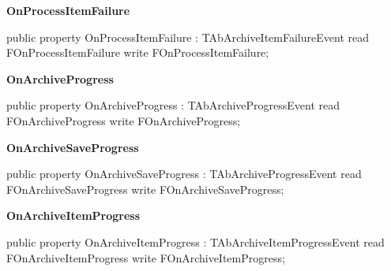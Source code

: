 \documentclass{report}
\newif\ifpdf
\begin{document}
\begin{list}{}
\begin{flushleft}
\ifpdf
\end{flushleft}
\fi


\par  \label{AbArcTyp.TAbArchive-OnProcessItemFailure}
\item[\textbf{OnProcessItemFailure}\hfill]
\ifpdf
\begin{flushleft}
\fi
\begin{ttfamily}
public property OnProcessItemFailure : TAbArchiveItemFailureEvent
      read FOnProcessItemFailure
      write FOnProcessItemFailure;\end{ttfamily}

\ifpdf
\end{flushleft}
\fi


\par  \label{AbArcTyp.TAbArchive-OnArchiveProgress}
\item[\textbf{OnArchiveProgress}\hfill]
\ifpdf
\begin{flushleft}
\fi
\begin{ttfamily}
public property OnArchiveProgress : TAbArchiveProgressEvent
      read FOnArchiveProgress
      write FOnArchiveProgress;\end{ttfamily}

\ifpdf
\end{flushleft}
\fi


\par  \label{AbArcTyp.TAbArchive-OnArchiveSaveProgress}
\item[\textbf{OnArchiveSaveProgress}\hfill]
\ifpdf
\begin{flushleft}
\fi
\begin{ttfamily}
public property OnArchiveSaveProgress : TAbArchiveProgressEvent           
      read FOnArchiveSaveProgress                                      
      write FOnArchiveSaveProgress;\end{ttfamily}

\ifpdf
\end{flushleft}
\fi


\par  \label{AbArcTyp.TAbArchive-OnArchiveItemProgress}
\item[\textbf{OnArchiveItemProgress}\hfill]
\ifpdf
\begin{flushleft}
\fi
\begin{ttfamily}
public property OnArchiveItemProgress : TAbArchiveItemProgressEvent
      read FOnArchiveItemProgress
      write FOnArchiveItemProgress;\end{ttfamily}


\end{flushleft}
\end{list}
\end{document}
